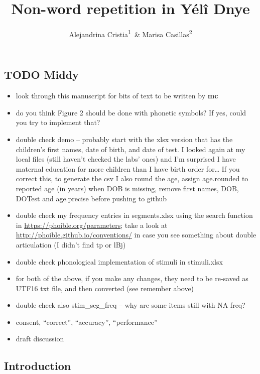 \documentclass[english,,man,floatsintext]{apa6}
\title{Non-word repetition in Yélî Dnye}
\author{Alejandrina Cristia\textsuperscript{1}~\& Marisa Casillas\textsuperscript{2}}
\date{}
\providecommand{\tightlist}{%
  \setlength{\itemsep}{0pt}\setlength{\parskip}{0pt}}
\begin{document}
\maketitle

\hypertarget{todo-middy}{%
\subsection{TODO Middy}\label{todo-middy}}

\begin{itemize}
\tightlist
\item
  look through this manuscript for bits of text to be written by \textbf{mc}
\item
  do you think Figure 2 should be done with phonetic symbols? If yes, could you try to implement that?
\item
  double check demo -- probably start with the xlsx version that has the children's first names, date of birth, and date of test. I looked again at my local files (still haven't checked the labs' ones) and I'm surprised I have maternal education for more children than I have birth order for\ldots{} If you correct this, to generate the csv I also round the age, assign age.rounded to reported age (in years) when DOB is missing, remove first names, DOB, DOTest and age.precise before pushing to github
\item
  double check my frequency entries in segments.xlsx using the search function in \url{https://phoible.org/parameters}; take a look at \url{http://phoible.github.io/conventions/} in case you see something about double articulation (I didn't find tp or lBj)
\item
  double check phonological implementation of stimuli in stimuli.xlsx
\item
  for both of the above, if you make any changes, they need to be re-saved as UTF16 txt file, and then converted (see remember above)
\item
  double check also stim\_seg\_freq -- why are some items still with NA freq?
\item
  consent, ``correct'', ``accuracy'', ``performance''
\item
  draft discussion
\end{itemize}

\hypertarget{introduction}{%
\subsection{Introduction}\label{introduction}}
\end{document}
